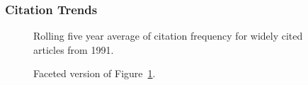\documentclass[
  10pt,
  letterpaper,
  DIV=11,
  numbers=noendperiod,
  twoside]{scrartcl}
\begin{document}
\subsubsection*{Citation Trends}\label{citation-trends-15}

\begin{figure}


\caption{\label{fig-citation-spaghetti-1991}Rolling five year average of
citation frequency for widely cited articles from 1991.}

\end{figure}%

\begin{figure}


\caption{\label{fig-citation-facet-1991}Faceted version of
Figure~\ref{fig-citation-spaghetti-1991}.}

\end{figure}%
\end{document}
